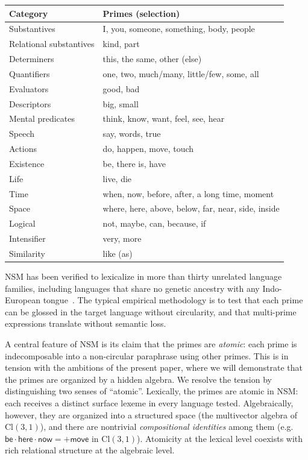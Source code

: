 \documentclass[11pt,a4paper]{article}
\theoremstyle{plain}
\theoremstyle{definition}
\theoremstyle{remark}
\numberwithin{equation}{section}
\providecommand{\Cl}{\mathrm{Cl}}
\begin{document}
\begin{center}
\begin{tabular}{ll}
\toprule
Category & Primes (selection) \\
\midrule
Substantives & I, you, someone, something, body, people \\
Relational substantives & kind, part \\
Determiners & this, the same, other (else) \\
Quantifiers & one, two, much/many, little/few, some, all \\
Evaluators & good, bad \\
Descriptors & big, small \\
Mental predicates & think, know, want, feel, see, hear \\
Speech & say, words, true \\
Actions & do, happen, move, touch \\
Existence & be, there is, have \\
Life & live, die \\
Time & when, now, before, after, a long time, moment \\
Space & where, here, above, below, far, near, side, inside \\
Logical & not, maybe, can, because, if \\
Intensifier & very, more \\
Similarity & like (as) \\
\bottomrule
\end{tabular}
\end{center}

NSM has been verified to lexicalize in more than thirty unrelated
language families, including languages that share no genetic
ancestry with any Indo-European tongue~\cite{goddard2008}.  The
typical empirical methodology is to test that each prime can be
glossed in the target language without circularity, and that
multi-prime expressions translate without semantic loss.

A central feature of NSM is its claim that the primes are
\emph{atomic}: each prime is indecomposable into a non-circular
paraphrase using other primes.  This is in tension with the
ambitions of the present paper, where we will demonstrate that the
primes are organized by a hidden algebra.  We resolve the tension by
distinguishing two senses of ``atomic''.  Lexically, the primes
are atomic in NSM: each receives a distinct surface lexeme in
every language tested.  Algebraically, however, they are organized
into a structured space (the multivector algebra of $\Cl(3,1)$),
and there are nontrivial \emph{compositional identities} among them
(e.g.\ $\mathsf{be} \cdot \mathsf{here} \cdot \mathsf{now} =
+\mathsf{move}$ in $\Cl(3,1)$).  Atomicity at the lexical level
coexists with rich relational structure at the algebraic level.
\end{document}
